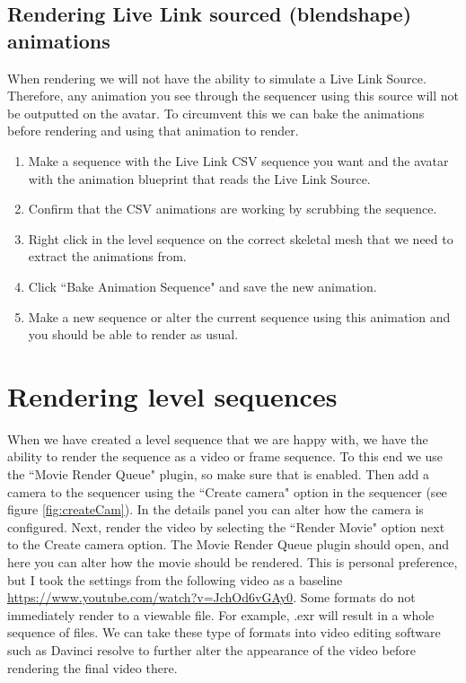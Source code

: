 \documentclass{uva-inf-article}
\begin{document}
\subsection{Rendering Live Link sourced (blendshape) animations}
When rendering we will not have the ability to simulate a Live Link Source. Therefore, any animation you see through the sequencer using this source will not be outputted on the avatar. To circumvent this we can bake the animations before rendering and using that animation to render.
\begin{enumerate}
    \item Make a sequence with the Live Link CSV sequence you want and the avatar with the animation blueprint that reads the Live Link Source.
    \item Confirm that the CSV animations are working by scrubbing the sequence.
    \item Right click in the level sequence on the correct skeletal mesh that we need to extract the animations from.
    \item Click ``Bake Animation Sequence" and save the new animation.
    \item Make a new sequence or alter the current sequence using this animation and you should be able to render as usual.
\end{enumerate}

\section{Rendering level sequences}
When we have created a level sequence that we are happy with, we have the ability to render the sequence as a video or frame sequence. To this end we use the ``Movie Render Queue" plugin, so make sure that is enabled. Then add a camera to the sequencer using the ``Create camera" option in the sequencer (see figure \ref{fig:createCam}). In the details panel you can alter how the camera is configured. Next, render the video by selecting the ``Render Movie" option next to the Create camera option. The Movie Render Queue plugin should open, and here you can alter how the movie should be rendered. This is personal preference, but I took the settings from the following video as a baseline \url{https://www.youtube.com/watch?v=JchOd6vGAy0}. Some formats do not immediately render to a viewable file. For example, .exr will result in a whole sequence of files. We can take these type of formats into video editing software such as Davinci resolve to further alter the appearance of the video before rendering the final video there.
\end{document}
